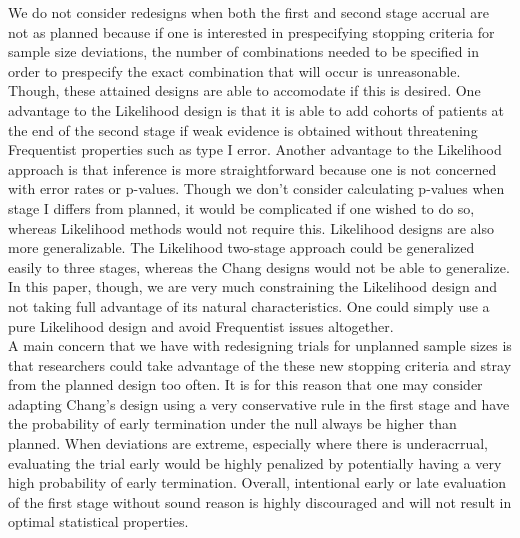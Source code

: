 \documentclass[12pt]{report}\usepackage[]{graphicx}\usepackage[]{color}
\newlength{\li}\setlength{\li}{14.48pt}
\newlength{\di}\setlength{\di}{-3.5mm}
\begin{document}
\indent We do not consider redesigns when both the first and second stage accrual are not as planned because if one is interested in prespecifying stopping criteria for sample size deviations, the number of combinations needed to be specified in order to prespecify the exact combination that will occur is unreasonable. Though, these attained designs are able to accomodate if this is desired. One advantage to the Likelihood design is that it is able to add cohorts of patients at the end of the second stage if weak evidence is obtained without threatening Frequentist properties such as type I error. Another advantage to the Likelihood approach is that inference is more straightforward because one is not concerned with error rates or p-values. Though we don't consider calculating p-values when stage I differs from planned, it would be complicated if one wished to do so, whereas Likelihood methods would not require this. Likelihood designs are also more generalizable. The Likelihood two-stage approach could be generalized easily to three stages, whereas the Chang designs would not be able to generalize. In this paper, though, we are very much constraining the Likelihood design and not taking full advantage of its natural characteristics. One could simply use a pure Likelihood design and avoid Frequentist issues altogether. \\
\indent A main concern that we have with redesigning trials for unplanned sample sizes is that researchers could take advantage of the these new stopping criteria and stray from the planned design too often. It is for this reason that one may consider adapting Chang's design using a very conservative rule in the first stage and have the probability of early termination under the null always be higher than planned. When deviations are extreme, especially where there is underacrrual, evaluating the trial early would be highly penalized by potentially having a very high probability of early termination. Overall, intentional early or late evaluation of the first stage without sound reason is highly discouraged and will not result in optimal statistical properties. 







%

		
\end{document}
